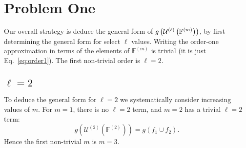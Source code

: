 \documentclass[11pt]{article}
\newcommand{\gxn}[1]{g\left(#1\right)}
\newcommand{\mcn}[2]{\mathcal{U}^{(#1)}\left(#2\right)}
\newcommand{\setf}{\mathbb{F}}
\newcommand{\setfn}[1]{\setf^{(#1)}}
\newcommand{\gapprox}[1]{g\left(#1\right)}
\begin{document}
\section{Problem One}

Our overall strategy is deduce the general form of $\gapprox{\lmers}$,
by first determining the general form for select $\ell$ values. Writing the
order-one approximation in terms of the elements of $\setfn{m}$ is
trivial (it is just Eq.~\ref{eq:order1}). The first non-trivial order is
$\ell=2$.

\subsection{$\ell=2$}

\newcommand{\unionset}[2]{\mcn{#1}{\setfn{#2}}}

To deduce the general form for $\ell=2$ we systematically consider increasing
values of $m$. For $m=1$, there is no $\ell=2$ term, and $m=2$ has a trivial
$\ell=2$ term:
\begin{equation}
	\gapprox{\unionset{2}{2}} = \gxn{f_1\cup f_2}.
\end{equation}
Hence the first non-trivial $m$ is $m=3$.


\newcommand{\Di}{f_{12}}
\newcommand{\Dj}{f_{13}}
\newcommand{\Dk}{f_{23}}
\newcommand{\Itwo}[2]{#1\cap #2}
\newcommand{\Ithree}[3]{\Itwo{#1}{#2}\cap #3}
\newcommand{\IDiDj}{\Itwo{\Di}{\Dj}}
\newcommand{\IDiDk}{\Itwo{\Di}{\Dk}}
\newcommand{\IDjDk}{\Itwo{\Dj}{\Dk}}
\newcommand{\IDiDjDk}{\Ithree{\Di}{\Dj}{\Dk}}
\newcommand{\itwo}[2]{\left(#1\cap #2\right)}
\newcommand{\Ii}{s_{12}}
\newcommand{\Ij}{s_{13}}
\newcommand{\Ik}{s_{23}}
\end{document}
